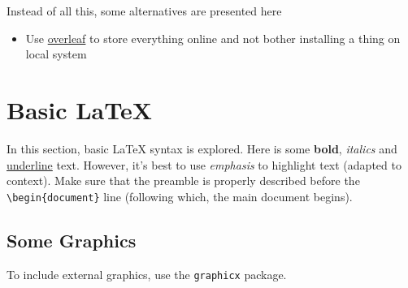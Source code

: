 \documentclass[]{article}
\begin{document}
Instead of all this, some alternatives are presented here

\begin{itemize}
    \item Use \href{https://www.overleaf.com/}{overleaf} to store everything online and not bother installing a thing on local system
\end{itemize}

\section{Basic \LaTeX{}}


In this section, basic \LaTeX{} syntax is explored. Here is some \textbf{bold}, \textit{italics} and \underline{underline} text. However, it's best to use \emph{emphasis} to highlight text (adapted to context). Make sure that the preamble is properly described before the \verb|\begin{document}| line (following which, the main document begins).

\subsection{Some Graphics}

To include external graphics, use the \texttt{graphicx} package.
\end{document}
